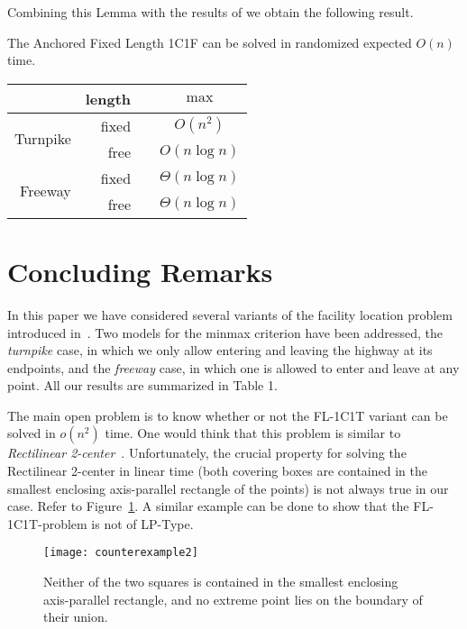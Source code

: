 \documentclass{llncs}
\begin{document}
Combining this Lemma with the results of \cite{c-oramtd-04} we obtain the following result.
\begin{theorem}
The Anchored Fixed Length 1C1F can be solved in randomized expected $O(n)$ time.
\end{theorem}
\fi




\begin{center}
\begin{tabular}{|r|r|c|c|}
\hline
& length &  & $\max$ \\
\hline
\multirow{2}{24mm}{Turnpike} & fixed &  & $O(n^2)$ \\
\cline{2-4}
& free &  & $O(n\log n)$ \\
\cline{1-4}
\multirow{2}{24mm}{Freeway}& fixed &  & $\Theta(n\log n)$\\
\cline{2-4}
& free & & $\Theta(n\log n)$ \\\hline
\end{tabular}
\end{center}

\section{Concluding Remarks}\label{conclu}
In this paper we have considered several variants of the facility location problem introduced in~\cite{espejo11}.
Two models for the minmax criterion have been addressed,  the {\em turnpike} case, in which we only allow entering and leaving the highway at its
endpoints, and the  {\em freeway} case, in which one is allowed to enter and leave at any
point. All our results are summarized in Table 1.

The main open problem is to know whether or not the FL-1C1T variant can be solved in $o(n^2)$ time. One would think that this problem is similar to  {\em Rectilinear 2-center}~\cite{sergey,drezner87}. Unfortunately, the crucial property for solving the Rectilinear 2-center in
linear time (both covering boxes are contained in
the smallest enclosing axis-parallel rectangle of the
points) is not always true in our case. Refer to Figure~\ref{fig:counterexample}. A similar example can be done to show that the FL-1C1T-problem is not of LP-Type.

\begin{figure}[htb]
    \centering
    \texttt{[image: counterexample2]}
    \caption{\small{Neither of the two squares is contained in the smallest enclosing
axis-parallel rectangle, and no extreme point lies on the boundary of their union.}}
    \label{fig:counterexample}
\end{figure}






{}

\end{document}
